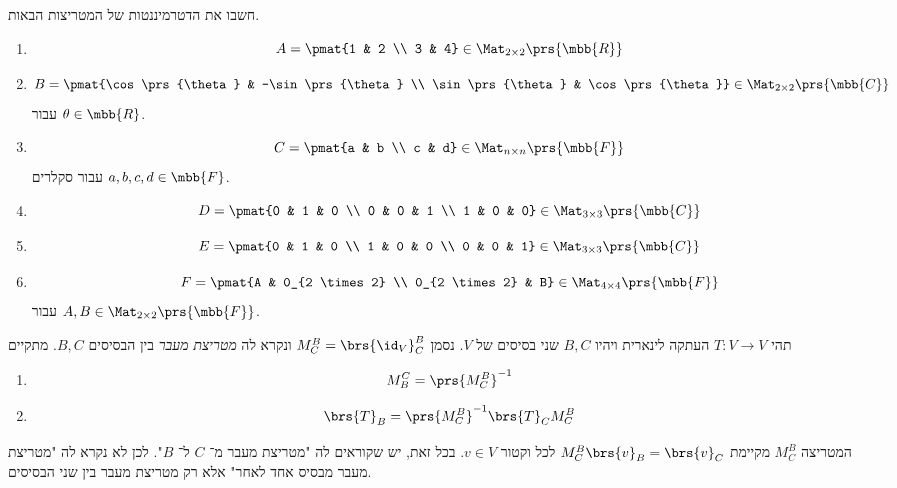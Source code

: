 \documentclass[a4paper,10pt,twoside,openany]{article}
\begin{document}
\begin{exercise}\label{exercise:matrix-determinant}
חשבו את הדטרמיננטות של המטריצות הבאות.

\begin{enumerate}
\item \[A = \pmat{1 & 2 \\ 3 & 4} \in \Mat_{2 \times 2}\prs{\mbb{R}}\]
\item \[B = \pmat{\cos\prs{\theta} & -\sin\prs{\theta} \\ \sin\prs{\theta} & \cos\prs{\theta}} \in \Mat_{2 \times 2}\prs{\mbb{C}}\]
עבור
$\theta \in \mbb{R}$.
\item \[C = \pmat{a & b \\ c & d} \in \Mat_{n \times n}\prs{\mbb{F}}\]
עבור סקלרים
$a,b,c,d \in \mbb{F}$.
\item \[D = \pmat{0 & 1 & 0 \\ 0 & 0 & 1 \\ 1 & 0 & 0} \in \Mat_{3 \times 3}\prs{\mbb{C}}\]
\item \[E = \pmat{0 & 1 & 0 \\ 1 & 0 & 0 \\ 0 & 0 & 1} \in \Mat_{3 \times 3}\prs{\mbb{C}}\]
\item \[F = \pmat{A & 0_{2 \times 2} \\ 0_{2 \times 2} & B} \in \Mat_{4 \times 4}\prs{\mbb{F}}\]
עבור
$A,B \in \Mat_{2 \times 2}\prs{\mbb{F}}$.
\end{enumerate}
\end{exercise}

\begin{proposition}\label{proposition:change-of-basis}
תהי
$T \colon V \to V$
העתקה לינארית ויהיו
$B,C$
שני בסיסים של
$V$.
נסמן
$M^B_C = \brs{\id_V}^B_C$
ונקרא לה
\emph{מטריצת מעבר}
בין הבסיסים
$B,C$.
מתקיים
\begin{enumerate}
\item \[M^C_B = \prs{M^B_C}^{-1}\]
\item \[\brs{T}_B = \prs{M^B_C}^{-1} \brs{T}_C M^B_C\]
\end{enumerate}
\end{proposition}

\begin{remark}
המטריצה
$M^B_C$
מקיימת
$M^B_C \brs{v}_B = \brs{v}_C$
לכל וקטור
$v \in V$.
בכל זאת, יש שקוראים לה
"מטריצת מעבר מ־%
$C$
ל־%
$B$".
לכן לא נקרא לה
"מטריצת מעבר מבסיס אחד לאחר"
אלא רק מטריצת מעבר בין שני הבסיסים.
\end{remark}
\end{document}
